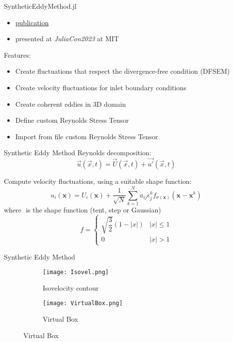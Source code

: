 \begin{frame}{SyntheticEddyMethod.jl}
\begin{itemize}
\item \href{https://www.theoj.org/joss-papers/joss.05565/10.21105.joss.05565.pdf}{publication}
\item presented at \textit{JuliaCon2023} at MIT
\end{itemize}

Features:
\begin{itemize}
\item Create fluctuations that respect the divergence-free condition (DFSEM)
\item Create velocity fluctuations for inlet boundary conditions
\item Create coherent eddies in 3D domain
\item Define custom Reynolds Stress Tensor
\item Import from file custom Reynolds Stress Tensor
\end{itemize}
\end{frame}


\begin{frame}{Synthetic Eddy Method}
Reynolds decomposition:
\begin{equation}
    \Vec{u}(\Vec{x},t) = \Vec{U}(\Vec{x},t) +  \Vec{u'}(\Vec{x},t)
    \label{sem:u}
\end{equation}

Compute velocity fluctuations, using a suitable shape function:
\begin{equation}
u_i(\boldsymbol{x})=U_i(\boldsymbol{x})+\frac{1}{\sqrt{N}} \sum_{k=1}^N a_{i j} \epsilon_j^k f_{\sigma(\boldsymbol{x})}\left(\boldsymbol{x}-\boldsymbol{x}^k\right)
\label{sem:ui}
\end{equation}
where $ $ is the shape function (tent, step or Gaussian)
\begin{equation}
    f = 
    \begin{cases}
      \sqrt{\dfrac{3}{2}}(1-|x|) & |x|\leq 1 \\
      0 & |x|>1
    \end{cases}
    \label{sem:tent}
\end{equation}
\end{frame}

\begin{frame}{Synthetic Eddy Method}

    \begin{figure}[h]
        \centering          
        \begin{subfigure}[h]{0.50\textwidth}
                 \centering
            \texttt{[image: Isovel.png]}
            \caption{Isovelocity contour}

       \end{subfigure}
             \hfill
        \begin{subfigure}[h]{0.45\textwidth}
         \centering
            \texttt{[image: VirtualBox.png]}
            \caption{Virtual Box}

        \end{subfigure}
        \end{figure} 

\end{frame}

